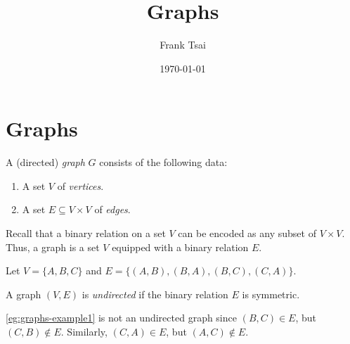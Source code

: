 \documentclass{amsart}
\title{Graphs}
\author{Frank Tsai}
\date{\today}
\begin{document}
\maketitle
\tableofcontents

\section{Graphs}
\label{sec:graphs}

\begin{defn}
  \label{defn:graphs}
  A (directed) \emph{graph} $G$ consists of the following data:
  \begin{enumerate}
  \item A set $V$ of \emph{vertices}.
  \item A set $E \subseteq V \times V$ of \emph{edges}.
  \end{enumerate}
\end{defn}

\para
\label{para:edges-are-binary-relations}
Recall that a binary relation on a set $V$ can be encoded as any subset of $V \times V$.
Thus, a graph is a set $V$ equipped with a binary relation $E$.

\begin{eg}
  \label{eg:graphs-example1}
  Let $V = \{A, B, C\}$ and $E = \{(A,B),(B,A),(B,C),(C,A)\}$.
  \begin{center}
  \end{center}
\end{eg}

\begin{defn}
  \label{defn:graphs-undirected}
  A graph $(V,E)$ is \emph{undirected} if the binary relation $E$ is symmetric.
\end{defn}

\para
\cref{eg:graphs-example1} is not an undirected graph since $(B,C) \in E$, but $(C,B) \notin E$.
Similarly, $(C,A) \in E$, but $(A,C) \notin E$.
\end{document}
